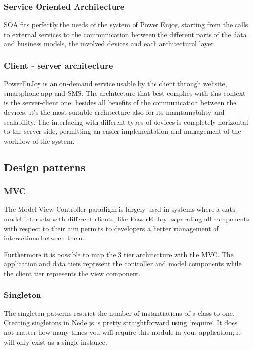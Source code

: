 \subsubsection{Service Oriented Architecture}
SOA fits perfectly the needs of  the system of Power Enjoy, starting from the calls to external services to the communication between the different parts of the data and business models, the involved devices and each architectural layer.

\subsubsection{Client - server architecture}
PowerEnJoy is an on-demand service usable by the client through website, smartphone app and SMS.
The architecture that best complies with this context is the server-client one: besides all benefits of the communication between the devices, it’s the most suitable architecture also for its maintainability and scalability.
The interfacing with different types of devices is completely horizontal to the server side, permitting an easier implementation and management of the workflow of the system.

\subsection{Design patterns}
\subsubsection{MVC}
The Model-View-Controller paradigm is largely used in systems where a data model interacts with different clients, like PowerEnJoy: separating all components with respect to their aim permits to developers a better management of interactions between them.

Furthermore it is possible to map the 3 tier architecture with the MVC. The application and data tiers represent the controller and model components while the client tier represents the view component.

\subsubsection{Singleton}
The singleton patterns restrict the number of instantiations of a class to one.
Creating singletons in Node.js is pretty straightforward using `require`.
It does not matter how many times you will require this module in your application; it will only exist as a single instance.

